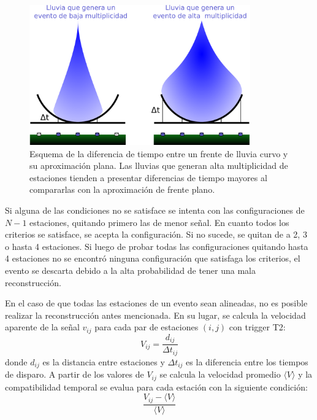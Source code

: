 	\begin{figure}[ht]
	\begin{center}
	\includegraphics[width=0.85\textwidth]{fig/seleccionAuger/plano_vs_curvo.pdf}
	\caption{Esquema de la diferencia de tiempo entre un frente de lluvia curvo y su aproximación plana. 
	Las lluvias que generan alta multiplicidad de estaciones tienden a presentar diferencias de tiempo mayores al compararlas con la aproximación de frente plano.}
	\label{fig:planeFrontAprox}
	\end{center}
	\end{figure}
	Si alguna de las condiciones no se satisface se intenta con las configuraciones de $N-1$ estaciones, quitando primero las de menor señal. 
	En cuanto todos los criterios se satisface, se acepta la configuración. Si no sucede, se quitan de a 2, 3 o hasta 4 estaciones.
	Si luego de probar todas las configuraciones quitando hasta 4 estaciones no se encontró ninguna configuración que satisfaga los criterios, el evento se descarta debido a la alta probabilidad de tener una mala reconstrucción.
	
	En el caso de que todas las estaciones de un evento sean alineadas, no es posible realizar la reconstrucción antes mencionada.
	En su lugar, se calcula la velocidad aparente de la señal $v_{ij}$ para cada par de estaciones $(i,j)$ con trigger T2:
	\begin{equation}
	 V_{ij}=\frac{d_{ij}}{\Delta t_{ij}}
	\end{equation}
	donde $d_{ij}$ es la distancia entre estaciones y $\Delta t_{ij}$ es la diferencia entre los tiempos de disparo.
	A partir de los valores de $V_{ij}$ se calcula la velocidad promedio $\langle V\rangle$ y la compatibilidad temporal se evalua para cada estación con la siguiente condición:
	\begin{equation}
	 \frac{V_{ij}-\langle V\rangle}{\langle V\rangle}
	\end{equation}



